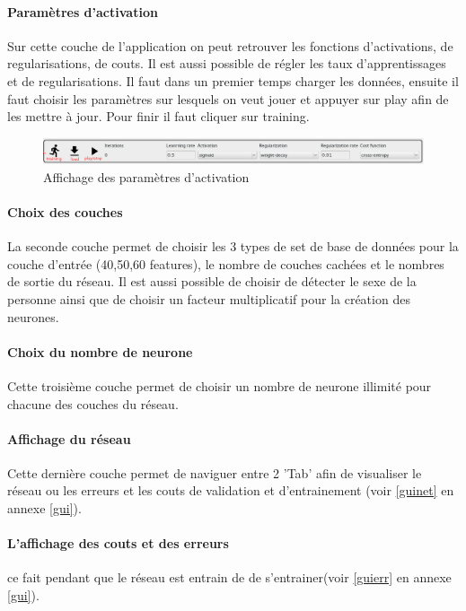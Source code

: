 \documentclass[11pt]{article}
\begin{document}
\paragraph{Param\`etres d'activation} Sur cette couche de l'application on
peut retrouver les fonctions d'activations, de regularisations, de couts.
Il est aussi possible de r\'egler les taux d'apprentissages et de
regularisations. Il faut dans un premier temps charger les donn\'ees, ensuite il faut choisir
les param\`etres sur lesquels on veut jouer et appuyer sur play afin de les
mettre \`a jour. Pour finir il faut cliquer sur training.
\begin{figure}[htp]
	\centering
	\includegraphics[scale=.4]{img/parametersLayer.png}
	\caption{Affichage des param\`etres d'activation}
\end{figure}

\paragraph{Choix des couches} La seconde couche permet de choisir les 3 types
de set de base de donn\'ees pour la couche d'entr\'ee (40,50,60 features), le
nombre de couches cach\'ees et le nombres de sortie du r\'eseau. Il est aussi
possible de choisir de d\'etecter le sexe de la personne ainsi que de choisir
un facteur multiplicatif pour la cr\'eation des neurones.

\paragraph{Choix du nombre de neurone} Cette troisi\`eme couche permet de
choisir un nombre de neurone illimit\'e pour chacune des couches du r\'eseau.

\paragraph{Affichage du r\'eseau} Cette derni\`ere couche permet de naviguer
entre 2 'Tab' afin de visualiser le r\'eseau ou les erreurs et les couts de
validation et d'entrainement (voir \ref{guinet} en annexe \ref{gui}).
\paragraph{L'affichage des couts et des erreurs} ce fait pendant que le
r\'eseau est entrain de de s'entrainer(voir \ref{guierr} en annexe \ref{gui}).
\end{document}
